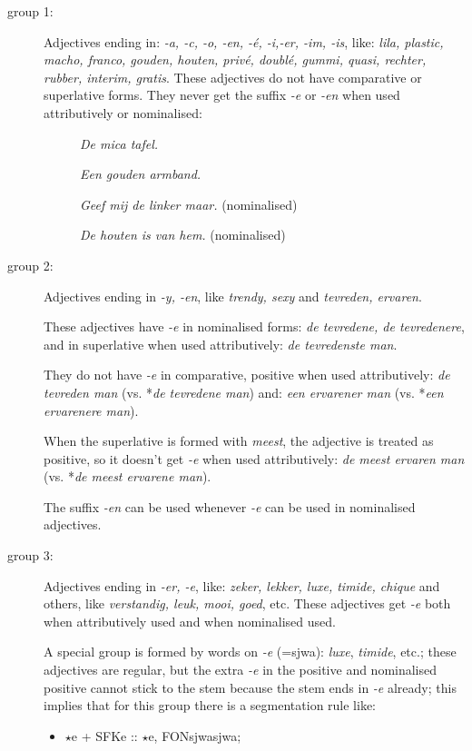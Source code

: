 \begin{description}
  \item [group 1:] Adjectives ending in: {\em -a, -c, -o, -en, -\'{e},
        -i,-er, -im, -is}, like: {\em lila, plastic, macho, franco, gouden,
        houten, priv\'{e}, doubl\'{e}, gummi, quasi, rechter, rubber,
        interim, gratis}. These adjectives do not have comparative or
        superlative forms. They never get the suffix {\em -e}   
        or {\em -en} when used attributively or nominalised:

\begin{description}
  \item [] {\em De mica tafel.}
  \item [] {\em Een gouden armband.}
  \item [] {\em Geef mij de linker maar.}   (nominalised)
  \item [] {\em De houten is van hem.}      (nominalised)
\end{description}

  \item [group 2:] Adjectives ending in {\em -y, -en}, like 
        {\em trendy, sexy} and {\em tevreden, ervaren}. 

        These adjectives 
        have {\em -e} in nominalised forms: {\em de tevredene,
        de tevredenere}, and in superlative when used attributively:
        {\em de tevredenste man}.

        They do not have {\em -e} in comparative, positive when used 
        attributively:
        {\em de tevreden man} (vs. *{\em de tevredene man}) and:
        {\em een ervarener man} (vs. *{\em een ervarenere man}).

        When the superlative is formed with {\em meest}, the adjective 
        is treated as positive, so it doesn't get {\em -e} when used 
        attributively: {\em de meest ervaren man} (vs. *{\em de meest ervarene
        man}).

        The suffix {\em -en} can be used whenever {\em -e} can be used in 
        nominalised adjectives.

  \item [group 3:] Adjectives ending in {\em -er, -e}, like:
        {\em zeker, lekker, luxe, timide, chique} and others, like
        {\em verstandig, leuk, mooi, goed}, etc. These adjectives get {\em -e}
        both when attributively used and when nominalised used. 

        A special group is formed by words on 
        {\em -e} (=sjwa): {\em luxe}, {\em timide}, etc.; these adjectives are 
        regular, but the extra {\em -e} in the positive and nominalised 
        positive cannot stick to the stem because the stem ends in {\em -e} 
        already; this implies that for this group there is a
        segmentation rule like:

        \begin{itemize}
             \item [\ ]  $\star$e   + SFKe  :: $\star$e, FONsjwasjwa;
        \end{itemize}

\end{description}


